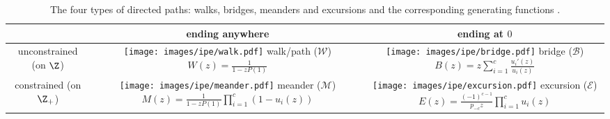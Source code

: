 \begin{table}[hbt!]
  \centering
  \begin{tabular}{|c|c|c|}
  \hline
  & ending anywhere & ending at $0$ \\ \hline
  \makecell{unconstrained \\ (on $\Z$)} &
  \makecell{\\ \texttt{[image: images/ipe/walk.pdf]} \\ walk/path ($\mathcal{W}$) \vspace{2mm} \\ $W(z) = \frac{1}{1-zP(1)}$ \vspace{2mm}} &
  \makecell{\\ \texttt{[image: images/ipe/bridge.pdf]} \\ bridge ($\mathcal{B}$) \vspace{2mm} \\ $B(z) = z \sum_{i=1}^c\frac{u_i'(z)}{u_i(z)}$ \vspace{2mm}} \\ \hline
  \makecell{constrained \\ (on $\Z_+$)} &
  \makecell{\\ \texttt{[image: images/ipe/meander.pdf]} \\ meander ($\mathcal{M}$) \vspace{2mm} \\ $M(z) = \frac{1}{1-zP(1)} \prod_{i=1}^c(1-u_i(z))$ \vspace{2mm}} &
  \makecell{\\ \texttt{[image: images/ipe/excursion.pdf]} \\ excursion ($\mathcal{E}$) \vspace{2mm} \\ $E(z) = \frac{(-1)^{c-1}}{p_{-c}z}\prod_{i=1}^c u_i(z)$ \vspace{2mm}} \\ \hline
  \end{tabular}
  \caption[The four types of directed paths.]{The four types of directed paths: walks, bridges, meanders and excursions and the corresponding generating functions \cite[Fig.~1]{Basic}.}
  \label{table:4paths}
\end{table}

